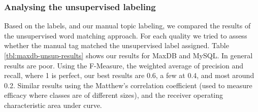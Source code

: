 \documentclass{acm_proc_article-sp}
\begin{document}
\subsubsection{Analysing the unsupervised labeling}

Based on the labels, and our manual topic labeling, we compared the results of the unsupervised word matching approach. For each quality we tried to assess whether the manual tag matched the unsupervised label assigned. Table \ref{tbl:maxdb-unsup-results} shows our results for MaxDB and MySQL. In general results are poor. Using the F-Measure, the weighted average of precision and recall, where 1 is perfect, our best results are 0.6, a few at 0.4, and most around 0.2. Similar results using the Matthew's correlation coefficient (used to measure efficacy where classes are of different sizes), and the receiver operating characteristic area under curve. 
\end{document}
